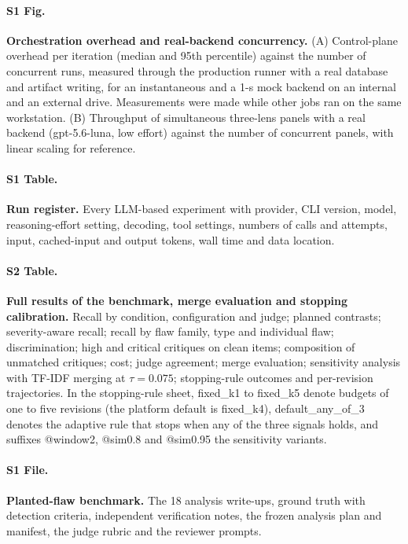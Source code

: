 \documentclass[10pt,letterpaper]{article}
\begin{document}
\paragraph*{S1 Fig.}
\label{S1_Fig}
{\bf Orchestration overhead and real-backend concurrency.} (A) Control-plane overhead per iteration (median and 95th percentile) against the number of concurrent runs, measured through the production runner with a real database and artifact writing, for an instantaneous and a 1-s mock backend on an internal and an external drive. Measurements were made while other jobs ran on the same workstation. (B) Throughput of simultaneous three-lens panels with a real backend (gpt-5.6-luna, low effort) against the number of concurrent panels, with linear scaling for reference.

\paragraph*{S1 Table.}
\label{S1_Table}
{\bf Run register.} Every LLM-based experiment with provider, CLI version, model, reasoning-effort setting, decoding, tool settings, numbers of calls and attempts, input, cached-input and output tokens, wall time and data location.

\paragraph*{S2 Table.}
\label{S2_Table}
{\bf Full results of the benchmark, merge evaluation and stopping calibration.} Recall by condition, configuration and judge; planned contrasts; severity-aware recall; recall by flaw family, type and individual flaw; discrimination; high and critical critiques on clean items; composition of unmatched critiques; cost; judge agreement; merge evaluation; sensitivity analysis with TF-IDF merging at $\tau=0.075$; stopping-rule outcomes and per-revision trajectories. In the stopping-rule sheet, fixed\_k1 to fixed\_k5 denote budgets of one to five revisions (the platform default is fixed\_k4), default\_any\_of\_3 denotes the adaptive rule that stops when any of the three signals holds, and suffixes @window2, @sim0.8 and @sim0.95 the sensitivity variants.

\paragraph*{S1 File.}
\label{S1_File}
{\bf Planted-flaw benchmark.} The 18 analysis write-ups, ground truth with detection criteria, independent verification notes, the frozen analysis plan and manifest, the judge rubric and the reviewer prompts.
\end{document}

